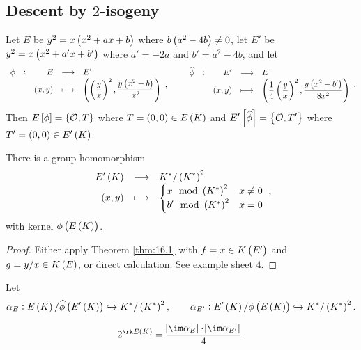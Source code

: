 \subsection{Descent by \texorpdfstring{$ 2 $}{2}-isogeny}


Let $ E $ be $ y^2 = x\br{x^2 + ax + b} $ where $ b\br{a^2 - 4b} \ne 0 $, let $ E' $ be $ y^2 = x\br{x^2 + a'x + b'} $ where $ a' = -2a $ and $ b' = a^2 - 4b $, and let
$$ \function[\phi]{E}{E'}{\br{x, y}}{\br{\br{\dfrac{y}{x}}^2, \dfrac{y\br{x^2 - b}}{x^2}}}, \qquad \function[\widehat{\phi}]{E'}{E}{\br{x, y}}{\br{\dfrac{1}{4}\br{\dfrac{y}{x}}^2, \dfrac{y\br{x^2 - b'}}{8x^2}}}. $$
Then $ E\sbr{\phi} = \cbr{\OOO, T} $ where $ T = \br{0, 0} \in E\br{K} $ and $ E'\sbr{\widehat{\phi}} = \cbr{\OOO, T'} $ where $ T' = \br{0, 0} \in E'\br{K} $.

\begin{proposition}
There is a group homomorphism
$$ \function{E'\br{K}}{K^* / \br{K^*}^2}{\br{x, y}}{
\begin{cases}
x \mod \br{K^*}^2 & x \ne 0 \\
b' \mod \br{K^*}^2 & x = 0
\end{cases}
}, $$
with kernel $ \phi\br{E\br{K}} $.
\end{proposition}

\begin{proof}
Either apply Theorem \ref{thm:16.1} with $ f = x \in K\br{E'} $ and $ g = y / x \in K\br{E} $, or direct calculation. See example sheet $ 4 $.
\end{proof}

\pagebreak

Let
$$ \alpha_E : E\br{K} / \widehat{\phi}\br{E'\br{K}} \hookrightarrow K^* / \br{K^*}^2, \qquad \alpha_{E'} : E'\br{K} / \phi\br{E\br{K}} \hookrightarrow K^* / \br{K^*}^2. $$

\begin{lemma}
$$ 2^{\rk E\br{K}} = \dfrac{\abs{\im \alpha_E} \cdot \abs{\im \alpha_{E'}}}{4}. $$
\end{lemma}

